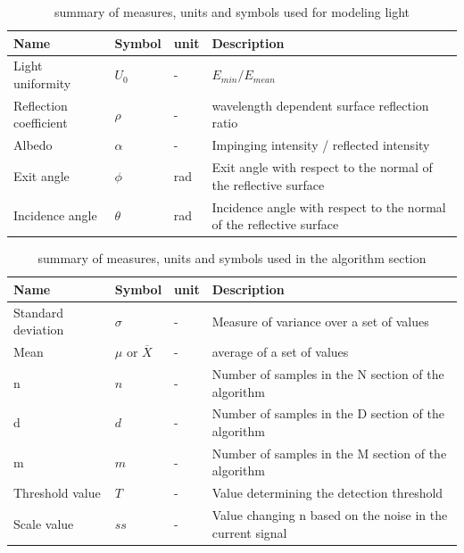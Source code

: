\begin{table}[h]
	\centering
	\label{Model_symbols}
	\begin{tabular}{llll}
		Name                                   & Symbol  & unit                          & Description                                        \\ \hline
		\multicolumn{1}{l|}{Light uniformity}  & $U_0$    & -                            & $E_{min}/E_{mean}$  \\
		\multicolumn{1}{l|}{Reflection coefficient}& $\rho$ & -                          & wavelength dependent surface reflection ratio\\
		\multicolumn{1}{l|}{Albedo}            & $\alpha$ & -                            & Impinging intensity / reflected intensity\\
		\multicolumn{1}{l|}{Exit angle}        & $\phi$   & rad                          & Exit angle with respect to the normal of the reflective surface\\
		\multicolumn{1}{l|}{Incidence angle}   & $\theta$ & rad                          & Incidence angle with respect to the normal of the reflective surface\\
	\end{tabular}
	\caption{summary of measures, units and symbols used for modeling light}
\end{table}

\begin{table}[h]
	\centering
	\label{Algorithm_symbols}
	\begin{tabular}{llll}
		Name                                   & Symbol   & unit   & Description                                        \\ \hline
		\multicolumn{1}{l|}{Standard deviation}& $\sigma$ & -      & Measure of variance over a set of values  \\
		\multicolumn{1}{l|}{Mean}              & $\mu$ or $\overline{X}$ & -      & average of a set of values  \\
		\multicolumn{1}{l|}{n}                 & $n$ & -      & Number of samples in the N section of the algorithm \\
		\multicolumn{1}{l|}{d}                 & $d$ & -      & Number of samples in the D section of the algorithm  \\
		\multicolumn{1}{l|}{m}                 & $m$ & -      & Number of samples in the M section of the algorithm \\
		\multicolumn{1}{l|}{Threshold value}   & $T$ & -      & Value determining the detection threshold \\
		\multicolumn{1}{l|}{Scale value}       & $ss$ & -     & Value changing n based on the noise in the current signal \\
	\end{tabular}
	\caption{summary of measures, units and symbols used in the algorithm section}
\end{table}

